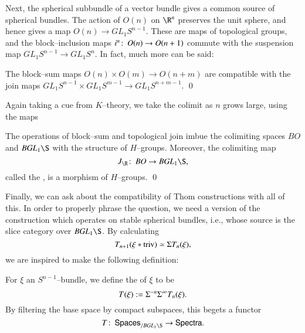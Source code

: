 Next, the spherical subbundle of a vector bundle gives a common source of spherical bundles.  The action of $O(n)$ on $\R^n$ preserves the unit sphere, and hence gives a map $O(n) \to GL_1 S^{n-1}$.  These are maps of topological groups, and the block--inclusion maps $i^n\colon\thinspace O(n) \to O(n+1)$ commute with the suspension map $GL_1 S^{n-1} \to GL_1 S^n$.  In fact, much more can be said:
\begin{lemma}\label{JIsMonoidal}
The block--sum maps $O(n) \times O(m) \to O(n+m)$ are compatible with the join maps $GL_1 S^{n-1} \times GL_1 S^{m-1} \to GL_1 S^{n+m-1}$. \qed
\end{lemma}
\noindent Again taking a cue from $K$--theory, we take the colimit as $n$ grows large, using the maps
\begin{center}
\end{center}
\begin{corollary}\label{DefnRealJHomomorphism}
The operations of block--sum and topological join imbue the colimiting spaces $BO$ and $B\GL_1 \S$ with the structure of $H$--groups.  Moreover, the colimiting map \[J_{\R}\co BO \to B\GL_1 \S,\] called the , is a morphism of $H$--groups. \qed
\end{corollary}
\noindent Finally, we can ask about the compatibility of Thom constructions with all of this.  In order to properly phrase the question, we need a version of the construction which operates on stable spherical bundles, i.e., whose source is the slice category over $B\GL_1 \S$.  By calculating \[T_{n+1}(\xi \ast \text{triv}) \simeq \Sigma T_n(\xi),\] we are inspired to make the following definition:

\begin{definition}
For $\xi$ an $S^{n-1}$--bundle, we define the  of $\xi$ to be \[T(\xi) := \Sigma^{-n} \Sigma^\infty T_n(\xi).\]  By filtering the base space by compact subspaces, this begets a functor \[T\co \CatOf{Spaces}_{/ B\GL_1 \S} \to \CatOf{Spectra}.\]
\end{definition}

